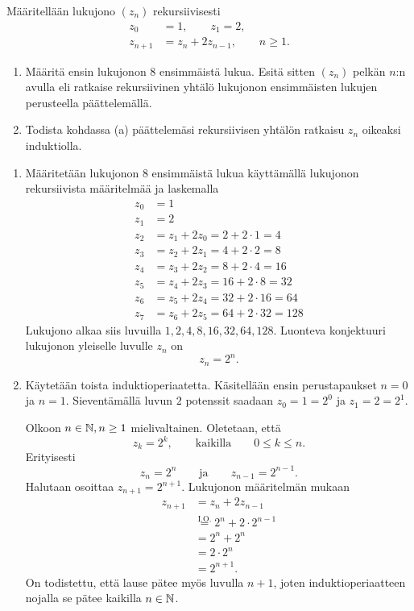 \documentclass[11pt,a4paper]{amsart}
\begin{document}
\begin{exercise}
Määritellään lukujono \(\left(z_n\right)\) rekursiivisesti
\begin{align*}
z_0 &= 1, \qquad z_1 = 2, \\
z_{n+1} &= z_n + 2z_{n-1}, \qquad n \geq 1.
\end{align*}

\begin{enumerate}[label=\alph*), nosep]
\item Määritä ensin lukujonon 8 ensimmäistä lukua. Esitä sitten
\(\left(z_n\right)\)
pelkän \(n\):n avulla eli ratkaise rekursiivinen yhtälö lukujonon
ensimmäisten lukujen perusteella päättelemällä.
\item Todista kohdassa (a) päättelemäsi rekursiivisen yhtälön ratkaisu
\(z_n\) oikeaksi induktiolla.
\end{enumerate}
\end{exercise}

\begin{solution}
\leavevmode\par
\begin{enumerate}[label=\alph*), nosep]
\item Määritetään lukujonon 8 ensimmäistä lukua käyttämällä lukujonon
rekursiivista määritelmää ja laskemalla
\begin{align*}
z_0 &= 1 \\
z_1 &= 2 \\
z_2 &= z_1 + 2z_0 = 2 + 2\cdot 1 = 4 \\
z_3 &= z_2 + 2z_1 = 4 + 2\cdot 2 = 8 \\
z_4 &= z_3 + 2z_2 = 8 + 2\cdot 4 = 16 \\
z_5 &= z_4 + 2z_3 = 16 + 2\cdot 8 = 32 \\
z_6 &= z_5 + 2z_4 = 32 + 2\cdot 16 = 64 \\
z_7 &= z_6 + 2z_5 = 64 + 2\cdot 32 = 128
\end{align*}
Lukujono alkaa siis luvuilla \(1, 2, 4, 8, 16, 32, 64, 128\). Luonteva
konjektuuri lukujonon yleiselle luvulle \(z_n\) on
\[z_n = 2^n.\]
\item Käytetään toista induktioperiaatetta. Käsitellään ensin perustapaukset
\(n = 0\) ja \(n = 1\). Sieventämällä luvun \(2\) potenssit saadaan
\(z_0 = 1 = 2^0\) ja
\(z_1 = 2 = 2^1\).

Olkoon \(n \in \mathbb{N}, n \geq 1\) mielivaltainen. Oletetaan, että
\[z_k = 2^k, \qquad \text{kaikilla} \qquad 0 \leq k \leq n.\]
Erityisesti
\[z_n = 2^n \qquad \text{ja} \qquad z_{n-1} = 2^{n-1}.\]
Halutaan osoittaa \(z_{n+1} = 2^{n+1}\). Lukujonon määritelmän mukaan
\begin{align*}
z_{n+1} &= z_n + 2z_{n-1} \\
&\overset{\text{I.O.}}{=} 2^n + 2\cdot 2^{n-1} \\
&= 2^n + 2^n \\
&= 2\cdot 2^n \\
&= 2^{n+1}.
\end{align*}
On todistettu, että lause pätee myös luvulla \(n + 1\), joten
induktioperiaatteen
nojalla se pätee kaikilla \(n \in \mathbb{N}\).
\end{enumerate}
\end{solution}
\end{document}

